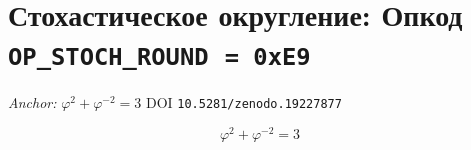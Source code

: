 %

\theoremstyle{plain}
\newtheorem{theorem}{Теорема}[chapter]
\newtheorem{lemma}[theorem]{Лемма}
\newtheorem{corollary}[theorem]{Следствие}
\newtheorem{definition}{Определение}[chapter]
\newtheorem{remark}{Замечание}[chapter]
\newtheorem{proposition}[theorem]{Утверждение}

\chapter{Стохастическое округление: Опкод
  \texttt{OP\_STOCH\_ROUND}~\texttt{=~0xE9}}%
\label{ch:glava88-stoch}

%
\noindent\textit{Anchor: } $\varphi^{2} + \varphi^{-2} = 3$ \quad DOI
\texttt{10.5281/zenodo.19227877}

\[
  \varphi^{2} + \varphi^{-2} = 3
\]

